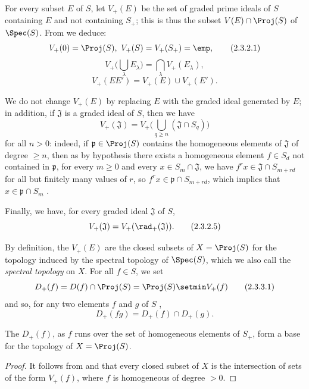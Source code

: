 \begin{env}[2.3.2]
\label{II.2.3.2}
For every subset $E$ of $S$, let $V_+(E)$ be the set of graded prime ideals of $S$ containing $E$ and not containing $S_+$;
this is thus the subset $V(E)\cap\Proj(S)$ of $\Spec(S)$.
From  we deduce:
\[
\label{II.2.3.2.1}
  V_+(0)=\Proj(S),\ V_+(S)=V_+(S_+)=\emp,
\tag{2.3.2.1}
\]
\[
\label{II.2.3.2.2}
  V_+\big(\textstyle\bigcup_\lambda E_\lambda\big)=\textstyle\bigcap_\lambda V_+(E_\lambda),
\tag{2.3.2.2}
\]
\[
\label{II.2.3.2.3}
  V_+(EE')=V_+(E)\cup V_+(E').
\tag{2.3.2.3}
\]

We do not change $V_+(E)$ by replacing $E$ with the graded ideal generated by $E$;
in addition, if $\mathfrak{J}$ is a graded ideal of $S$, then we have
\[
\label{II.2.3.2.4}
  V_+(\mathfrak{J})=V_+\big(\textstyle\bigcup_{q\geq n}(\mathfrak{J}\cap S_q)\big)
\tag{2.3.2.4}
\]
for all $n>0$: indeed, if $\mathfrak{p}\in\Proj(S)$ contains the homogeneous elements of $\mathfrak{J}$ of degree $\geq n$, then as by hypothesis there exists a homogeneous element $f\in S_d$ not contained in $\mathfrak{p}$, for every $m\geq 0$ and every $x\in S_m\cap\mathfrak{J}$, we have $f^r x\in\mathfrak{J}\cap S_{m+rd}$ for all but finitely many values of $r$, so $f^r x\in\mathfrak{p}\cap S_{m+rd}$, which implies that $x\in\mathfrak{p}\cap S_m$ .

Finally, we have, for every graded ideal $\mathfrak{J}$ of $S$,
\[
  V_+(\mathfrak{J})=V_+(\rad_+(\mathfrak{J})).
\tag{2.3.2.5}
\]
\end{env}

\begin{env}[2.3.3]
\label{II.2.3.3}
By definition, the $V_+(E)$ are the closed subsets of $X=\Proj(S)$ for the topology induced by the spectral topology of $\Spec(S)$, which we also call the \emph{spectral topology} on $X$.
For all $f\in S$, we set
\[
\label{II.2.3.3.1}
  D_+(f) = D(f)\cap\Proj(S) = \Proj(S)\setmin V_+(f)
\tag{2.3.3.1}
\]
and so, for any two elements $f$ and $g$ of $S$ ,
\[
\label{II.2.3.3.2}
  D_+(fg) = D_+(f)\cap D_+(g).
\tag{2.3.3.2}
\]
\end{env}

\begin{proposition}[2.3.4]
\label{II.2.3.4}
The $D_+(f)$, as $f$ runs over the set of homogeneous elements of $S_+$, form a base for the topology of $X=\Proj(S)$.
\end{proposition}

\begin{proof}
It follows from  and  that every closed subset of $X$ is the intersection of sets of the form $V_+(f)$, where $f$ is homogeneous of degree $>0$.
\end{proof}


